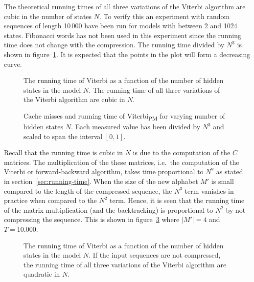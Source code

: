 The theoretical running times of all three variations of the Viterbi algorithm
are cubic in the number of states $N$. To verify this an experiment with random
sequences of length 10\,000 have been run for models with between 2 and 1024
states. Fibonacci words has not been used in this experiment since the running
time does not change with the compression. The running time divided by $N^3$ is
shown in figure~\ref{fig:assymptotic_viterbi_backtrack_N}. It is expected that
the points in the plot will form a decreasing curve. 

\begin{figure}
  \centering
  
  \caption{The running time of Viterbi as a function of the number of hidden
    states in the model $N$. The running time of all three variations of the Viterbi
    algorithm are cubic in $N$.}
  \label{fig:assymptotic_viterbi_backtrack_N}
\end{figure}

\begin{figure}
  \centering
  
  \caption{Cache misses and running time of Viterbi\textsubscript{PM} for
    varying number of hidden states $N$. Each measured value has been divided
    by $N^3$ and scaled to span the interval $[0, 1]$.}
  \label{fig:cache-misses}
\end{figure}

Recall that the running time is cubic in $N$ is due to the computation of the
$C$ matrices. The multiplication of the these matrices, i.e.\ the computation
of the Viterbi or forward-backward algorithm, takes time
proportional to $N^2$ as stated in section~\ref{sec:running-time}. When the
size of the new alphabet $M'$ is small compared to the length of the compressed
sequence, the $N^3$ term vanishes in practice when compared to the $N^2$
term. Hence, it is seen that the running time of the matrix multiplication
(and the backtracking) is proportional to $N^2$ by not compressing the
sequence. This is shown in figure~\ref{fig:assymptotic_viterbi_N} where
$\lvert M' \rvert = 4$ and $T = 10.000$.

\begin{figure}
  \centering
  
  \caption{The running time of Viterbi as a function of the number of hidden
    states in the model $N$. If the input sequences are not compressed, the
    running time of all three variations of the Viterbi algorithm are quadratic
    in $N$.}
  \label{fig:assymptotic_viterbi_N}
\end{figure}

